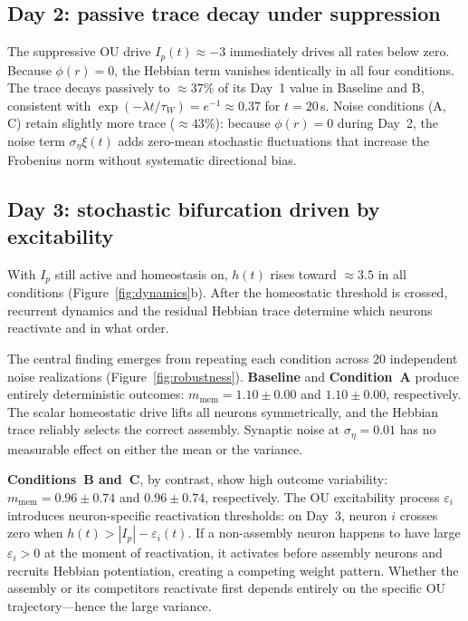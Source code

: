 \documentclass[11pt,a4paper]{article}
\begin{document}
\subsection{Day 2: passive trace decay under suppression}

The suppressive OU drive $I_p(t) \approx -3$ immediately drives all rates below zero.
Because $\phi(r)=0$, the Hebbian term vanishes identically in all four conditions.
The trace decays passively to $\approx37\%$ of its Day~1 value in Baseline and B,
consistent with $\exp(-\lambda t/\tau_W) = e^{-1} \approx 0.37$ for $t=20$\,s.
Noise conditions (A, C) retain slightly more trace ($\approx43\%$): because
$\phi(r)=0$ during Day~2, the noise term $\sigma_\eta\xi(t)$ adds zero-mean
stochastic fluctuations that increase the Frobenius norm without systematic
directional bias.

\subsection{Day 3: stochastic bifurcation driven by excitability}

With $I_p$ still active and homeostasis on, $h(t)$ rises toward $\approx3.5$
in all conditions (Figure~\ref{fig:dynamics}b).  After the homeostatic threshold
is crossed, recurrent dynamics and the residual Hebbian trace determine which
neurons reactivate and in what order.

The central finding emerges from repeating each condition across 20 independent
noise realizations (Figure~\ref{fig:robustness}).  \textbf{Baseline} and
\textbf{Condition~A} produce entirely deterministic outcomes:
$m_\mathrm{mem} = 1.10 \pm 0.00$ and $1.10 \pm 0.00$, respectively.
The scalar homeostatic drive lifts all neurons symmetrically, and the Hebbian
trace reliably selects the correct assembly.  Synaptic noise at $\sigma_\eta=0.01$
has no measurable effect on either the mean or the variance.

\textbf{Conditions~B and~C}, by contrast, show high outcome variability:
$m_\mathrm{mem} = 0.96 \pm 0.74$ and $0.96 \pm 0.74$, respectively.
The OU excitability process $\varepsilon_i$ introduces neuron-specific
reactivation thresholds: on Day~3, neuron $i$ crosses zero when
$h(t) > |I_p| - \varepsilon_i(t)$.  If a non-assembly neuron happens to have
large $\varepsilon_i > 0$ at the moment of reactivation, it activates before
assembly neurons and recruits Hebbian potentiation, creating a competing weight
pattern.  Whether the assembly or its competitors reactivate first depends
entirely on the specific OU trajectory---hence the large variance.
\end{document}
